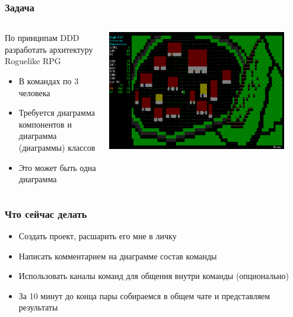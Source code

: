 \documentclass[xetex,mathserif,serif]{beamer}
\begin{document}
    \begin{frame}
        \frametitle{Задача}
        \begin{columns}
            \begin{column}{0.5\textwidth}
                По принципам DDD разработать архитектуру Roguelike RPG

                \begin{itemize}
                    \item В командах по 3 человека
                    \item Требуется диаграмма компонентов и диаграмма (диаграммы) классов
                    \item Это может быть одна диаграмма
                \end{itemize}
            \end{column}
            \begin{column}{0.5\textwidth}
                \begin{center}
                    \includegraphics[width=0.9\textwidth]{roguelike.png}
                \end{center}
            \end{column}
        \end{columns}
    \end{frame}

    \begin{frame}
        \frametitle{Что сейчас делать}
        \begin{itemize}
            \item Создать проект, расшарить его мне в личку
            \item Написать комментарием на диаграмме состав команды
            \item Использовать каналы команд для общения внутри команды (опционально)
            \item За 10 минут до конца пары собираемся в общем чате и представляем результаты
        \end{itemize}
    \end{frame}
\end{document}
